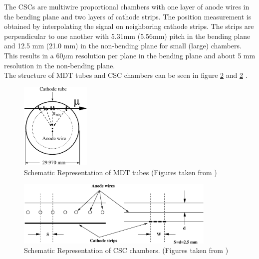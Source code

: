 \indent The CSCs are multiwire proportional chambers with one layer of anode wires in the bending plane and two layers of cathode strips. The position measurement is obtained by interpolating the signal on neighboring cathode strips. The strips are perpendicular to one another with 5.31mm (5.56mm) pitch in the bending plane and 12.5 mm (21.0 mm) in the non-bending plane for small (large) chambers.   This results in a $60 \mu$m resolution per plane in the bending plane and about 5 mm resolution in the non-bending plane. \\ %

\indent The structure of MDT tubes and CSC chambers can be seen in figure \ref{LHC:fig:MDT} and \ref{LHC:fig:MDT} . \\

\begin{figure}[h!]
\centering
\includegraphics[width=0.30\textwidth, angle=0]{figures/LHC_ATLAS/MDT_tube_cross_section.eps}
\caption[Schematic Representation of MDT tubes]{ Schematic Representation of MDT tubes (Figures taken from \cite{ATLAS_JINST}) \label{LHC:fig:MDT}}
\end{figure}

\begin{figure}[h!]
\centering
\includegraphics[width=0.85\textwidth, angle=0]{figures/LHC_ATLAS/CSC_structure.eps}
\caption[Schematic Representation of CSC chambers]{ Schematic Representation of CSC chambers. (Figures taken from \cite{ATLAS_JINST}) \label{LHC:fig:MDT}}
\end{figure}

